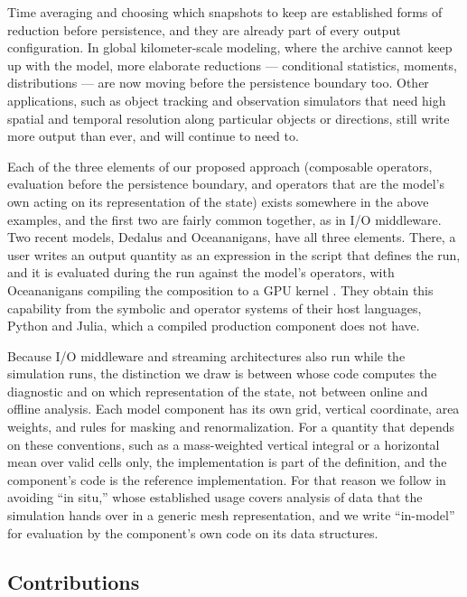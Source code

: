\documentclass[gmd, manuscript]{copernicus}
\begin{document}
Time averaging and choosing which snapshots to keep are established forms of reduction before persistence, and they are already part of every output configuration. In global kilometer-scale modeling, where the archive cannot keep up with the model, more elaborate reductions --- conditional statistics, moments, distributions --- are now moving before the persistence boundary too. Other applications, such as object tracking and observation simulators that need high spatial and temporal resolution along particular objects or directions, still write more output than ever, and will continue to need to.

Each of the three elements of our proposed approach (composable operators, evaluation before the persistence boundary, and operators that are the model's own acting on its representation of the state) exists somewhere in the above examples, and the first two are fairly common together, as in I/O middleware. Two recent models, Dedalus and Oceananigans, have all three elements. There, a user writes an output quantity as an expression in the script that defines the run, and it is evaluated during the run against the model's operators, with Oceananigans compiling the composition to a GPU kernel \citep{burns_dedalus_2020,ramadhan_oceananigansjl_2020}. They obtain this capability from the symbolic and operator systems of their host languages, Python and Julia, which a compiled production component does not have.

Because I/O middleware and streaming architectures also run while the simulation runs, the distinction we draw is between whose code computes the diagnostic and on which representation of the state, not between online and offline analysis. Each model component has its own grid, vertical coordinate, area weights, and rules for masking and renormalization. For a quantity that depends on these conventions, such as a mass-weighted vertical integral or a horizontal mean over valid cells only, the implementation is part of the definition, and the component's code is the reference implementation. For that reason we follow \citet{childs_terminology_2020} in avoiding ``in situ,'' whose established usage covers analysis of data that the simulation hands over in a generic mesh representation, and we write ``in-model'' for evaluation by the component's own code on its data structures.

\subsection{Contributions}
\label{sec:contribs}
\end{document}
